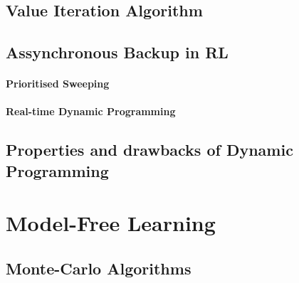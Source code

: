 
	\subsection{Value Iteration Algorithm} %
		\label{sub:value_iteration_algorithm}
	

	\subsection{Assynchronous Backup in RL} %
		\label{sub:assynchronous_backup_in_rl}
		
		\paragraph{Prioritised Sweeping} %
			\label{par:prioritised_sweeping}
		

		\paragraph{Real-time Dynamic Programming} %
			\label{par:real_time_dynamic_programming}
		

	
	\subsection{Properties and drawbacks of Dynamic Programming} %
		\label{sub:properties_and_drawbacks_of_dynamic_programming}
	


\section{Model-Free Learning} %
	\label{sec:model_free_learning}

	\subsection{Monte-Carlo Algorithms} %
		\label{sub:monte_carlo_algorithm}

